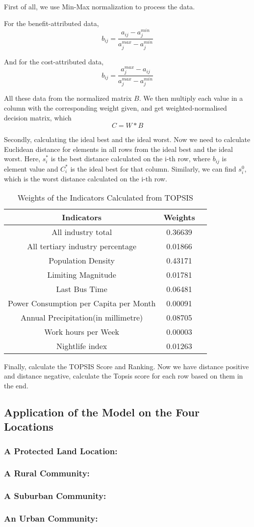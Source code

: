 First of all, we use Min-Max normalization to process the data.

For the benefit-attributed data,
$$b_{ij}=\frac{a_{ij}-a_j^{min}}{a_j^{max}-a_j^{min}}$$

And for the cost-attributed data,
$$b_{ij}=\frac{a_{j}^{max}-a_{ij}}{a_j^{max}-a_j^{min}}$$

All these data from the normalized matrix $B$. We then multiply each value in a column with the corresponding weight given, and get weighted-normalised decision matrix, which $$C=W*B$$

Secondly, calculating the ideal best and the ideal worst. Now we need to calculate Euclidean distance for elements in all rows from the ideal best and the ideal worst. Here, $s_i^*$ is the best distance calculated on the i-th row, where $b_{ij}$ is element value and $C_i^{*}$ is the ideal best for that column. Similarly, we can find $s_i^0$, which is the worst distance calculated on the i-th row.

\begin{table}[H] \centering
    \caption{Weights of the Indicators Calculated from TOPSIS}
    \begin{tabular}{ccl}
        \toprule
        Indicators & Weights\\ \hline
        All industry total & 0.36639\\
        All tertiary industry percentage & 0.01866\\
        Population Density & 0.43171\\
        Limiting Magnitude & 0.01781\\
        Last Bus Time & 0.06481\\
        Power Consumption per Capita per Month & 0.00091\\
        Annual Precipitation(in millimetre) & 0.08705\\
        Work hours per Week & 0.00003\\
        Nightlife index & 0.01263\\
        \bottomrule
    \end{tabular}
\end{table}

Finally, calculate the TOPSIS Score and Ranking. Now we have distance positive and distance negative, calculate the Topsis score for each row based on them in the end.

\subsection{Application of the Model on the Four Locations}


\subsubsection{A Protected Land Location: }

\subsubsection{A Rural Community: }

\subsubsection{A Suburban Community: }

\subsubsection{An Urban Community: }

